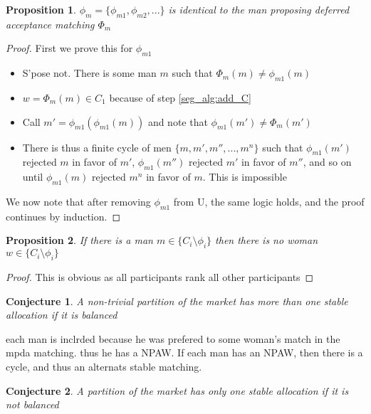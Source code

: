 \documentclass[WP]{AEA}
\newtheorem{prop}{Proposition}
\newtheorem{conj}{Conjecture}
\begin{document}
\begin{prop}
	$\phi_m = \{\phi_{m1}, \phi_{m2}, ...\}$ is identical to the man proposing deferred acceptance matching $\Phi_m $
\end{prop}
\begin{proof}
	First we prove this for $\phi_{m1}$
	\begin{itemize}
		\item S'pose not. There is some man $m$ such that $\Phi_m(m) \neq \phi_{m1}(m)$
		\item $w = \Phi_m(m) \in C_1$ because of step \ref{seg_alg:add_C}
		\item Call $m' =  \phi_{m1}(\phi_{m1}(m)) $ and note that $ \phi_{m1}(m') \neq \Phi_m(m')$ 
		\item There is thus a finite cycle of men $\{m, m', m'', ... , m^n\}$ such that $ \phi_{m1}(m') $ rejected $m$ in favor of $m'$, $ \phi_{m1}(m'') $ rejected $m'$ in favor of $m''$, and so on until $ \phi_{m1}(m) $ rejected $m^n$ in favor of       $m$.  This is impossible
	\end{itemize}
We now note that after removing $\phi_{m1}$ from U, the same logic holds, and the proof continues by induction. 
\end{proof}
\begin{prop}
	If there is a man $m \in \{C_i  \setminus \phi_i\}$ then there is no woman $w \in \{C_i  \setminus \phi_i\}$
\end{prop}
\begin{proof}
	This is obvious as all participants rank all other participants
\end{proof}
	
\begin{conj}
	A non-trivial partition of the market has more than one stable allocation if it is balanced
\end{conj}
	each man is inclrded because he was prefered to some woman's match in the mpda matching.  thus he has a NPAW.  If each man has an NPAW, then there is a cycle, and thus an alternats stable matching.
\begin{conj}
		A partition of the market has only one stable allocation if it is not balanced
\end{conj}
	
\end{document}
